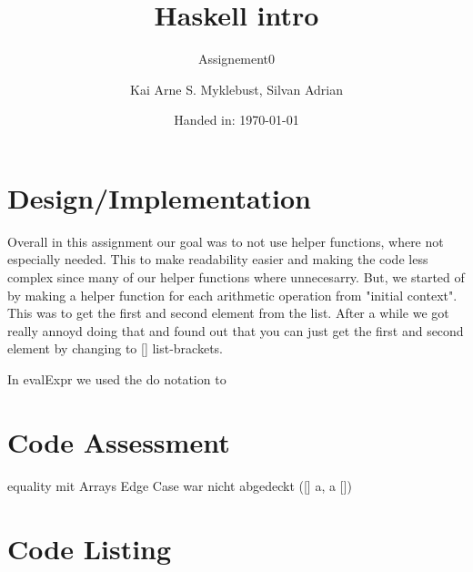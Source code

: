 \documentclass[12pt,a4paper]{article}
\begin{document}
\title{Haskell intro}
\subtitle{Assignement0}

\author{Kai Arne S. Myklebust, Silvan Adrian}
\date{Handed in: \today}
	
\maketitle
\tableofcontents

\section{Design/Implementation}

Overall in this assignment our goal was to not use helper functions, where not especially needed. This to make readability easier and making the code less complex since many of our helper functions where unnecesarry.
But, we started of by making a helper function for each arithmetic operation from "initial context". This was to get the first and second element from the list. After a while we got really annoyd doing that and found out that you can just get the first and second element by changing to [] list-brackets.

In evalExpr we used the do notation to

\section{Code Assessment}

equality mit Arrays Edge Case war nicht abgedeckt ([] a, a [])


\appendix
\section{Code Listing}

\inputminted{haskell}{assignement1/src/SubsInterpreter.hs}
\end{document}
